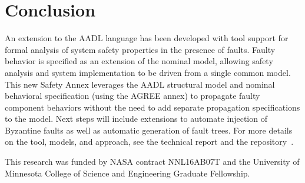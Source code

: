 \section{Conclusion}

An extension to the AADL language has been developed with tool support for formal analysis of system safety properties in the presence of faults. Faulty behavior is specified as an extension of the nominal model, allowing safety analysis and system implementation to be driven from a single common model. This new Safety Annex leverages the AADL structural model and nominal behavioral specification (using the AGREE annex) to propagate faulty component behaviors without the need to add separate propagation specifications to the model.   Next steps will include extensions to automate injection of Byzantine faults as well as automatic generation of fault trees.  For more details on the tool, models, and approach, see the technical report and the repository~\cite{SATechReport, amaseRepo}.

\vspace{2 mm}
 This research was funded by NASA contract NNL16AB07T and the University of Minnesota College of Science and Engineering Graduate Fellowship.



